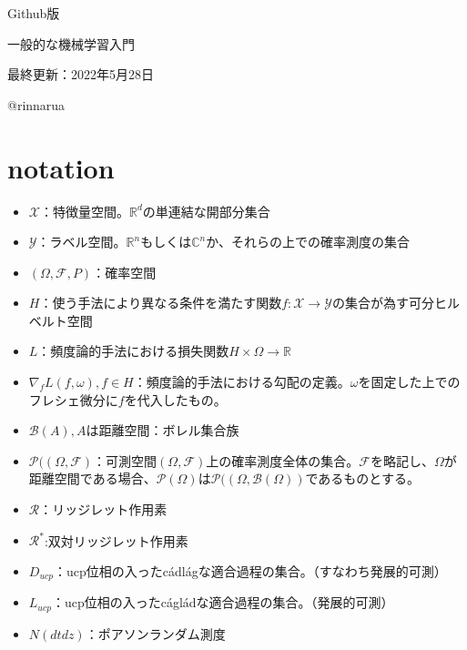 \documentclass{jsarticle}
\begin{document}
\begin{center}
  
  \Huge Github版 \par
  \vspace{15mm}
  \Huge 一般的な機械学習入門\par
  \vspace{90mm}
  \Large 最終更新：2022年5月28日 \par
  \Large @rinnarua\par

\end{center}
\thispagestyle{empty}
\clearpage
\addtocounter{page}{-1}







\newpage


 \tableofcontents
 \clearpage
\section*{notation}
\begin{itemize}
\item $\mathcal{X}$：特徴量空間。$\mathbb{R}^d$の単連結な開部分集合
\item $\mathcal{Y}$：ラベル空間。$\mathbb{R}^n$もしくは$\mathbb{C}^n$か、それらの上での確率測度の集合
\item $(\Omega,\mathcal{F},P)$：確率空間
\item $H$：使う手法により異なる条件を満たす関数$f:\mathcal{X}\to\mathcal{Y}$の集合が為す可分ヒルベルト空間
\item $L$：頻度論的手法における損失関数$H\times\Omega \to \mathbb{R}$
\item $\nabla_f L(f,\omega),f\in H$：頻度論的手法における勾配の定義。$\omega$を固定した上でのフレシェ微分に$f$を代入したもの。
\item $\mathcal{B}(A),A$は距離空間：ボレル集合族
\item $\mathcal{P}((\Omega,\mathcal{F})$：可測空間$(\Omega,\mathcal{F})$上の確率測度全体の集合。$\mathcal{F}$を略記し、$\Omega$が距離空間である場合、$\mathcal{P}(\Omega)$は$\mathcal{P}((\Omega,\mathcal{B}(\Omega))$であるものとする。
\item $\mathcal{R}$：リッジレット作用素
\item $\mathcal{R}^*$:双対リッジレット作用素
\item $D_{ucp}$：ucp位相の入ったc\'{a}dl\'{a}gな適合過程の集合。（すなわち発展的可測）
\item $L_{ucp}$：ucp位相の入ったc\'{a}gl\'{a}dな適合過程の集合。（発展的可測）
\item $N(dtdz)$：ポアソンランダム測度

\end{itemize}
\end{document}
